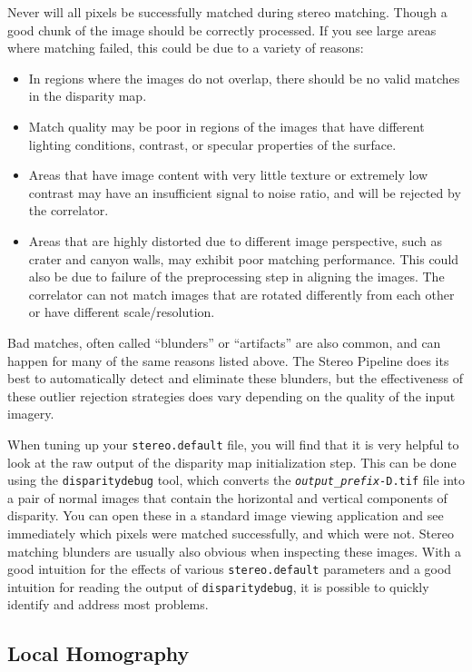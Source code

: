 Never will all pixels be successfully matched during stereo
matching. Though a good chunk of the image should be correctly
processed. If you see large areas where matching failed, this could be
due to a variety of reasons:

\begin{itemize}
\item In regions where the images do not overlap, there should be no
  valid matches in the disparity map.
\item Match quality may be poor in regions of the images that have
  different lighting conditions, contrast, or specular properties of
  the surface.
\item Areas that have image content with very little texture or
  extremely low contrast may have an insufficient signal to noise
  ratio, and will be rejected by the correlator.
\item Areas that are highly distorted due to different image
  perspective, such as crater and canyon walls, may exhibit poor
  matching performance. This could also be due to failure of the
  preprocessing step in aligning the images. The correlator can not
  match images that are rotated differently from each other or have
  different scale/resolution.
\end{itemize}

Bad matches, often called ``blunders'' or ``artifacts'' are also
common, and can happen for many of the same reasons listed above.  The
Stereo Pipeline does its best to automatically detect and eliminate
these blunders, but the effectiveness of these outlier rejection
strategies does vary depending on the quality of the input imagery.

When tuning up your {\tt stereo.default} file, you will find that
it is very helpful to look at the raw output of the disparity map
initialization step.  This can be done using the {\tt disparitydebug}
tool, which converts the \texttt{\textit{output\_prefix}-D.tif}
file into a pair of normal images that contain the horizontal and
vertical components of disparity.  You can open these in a standard
image viewing application and see immediately which pixels were
matched successfully, and which were not. Stereo matching blunders
are usually also obvious when inspecting these images.  With a good
intuition for the effects of various {\tt stereo.default} parameters
and a good intuition for reading the output of {\tt disparitydebug},
it is possible to quickly identify and address most problems.

\subsection{Local Homography}
\label{sec:local_hom}


